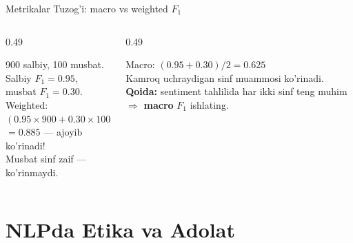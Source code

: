 \documentclass[aspectratio=169,11pt]{beamer}
\begin{document}
\begin{frame}{Metrikalar Tuzog'i: macro vs weighted $F_1$}
  \begin{columns}[T]
    \begin{column}{0.49\textwidth}
      \begin{tcolorbox}[warnbox,title=weighted $F_1$ --- aldaydi]
        \small
        900 salbiy, 100 musbat.\\
        Salbiy $F_1{=}0.95$, musbat $F_1{=}0.30$.\\[4pt]
        Weighted:\\
        $(0.95\!\times\!900+0.30\!\times\!100)/1000$\\
        $=0.885$ --- ajoyib ko'rinadi!\\[2pt]
        \alert{Musbat sinf zaif --- ko'rinmaydi.}
      \end{tcolorbox}
    \end{column}
    \begin{column}{0.49\textwidth}
      \begin{tcolorbox}[okbox,title=macro $F_1$ --- to'g'riroq]
        \small
        Macro: $(0.95+0.30)/2=0.625$\\[4pt]
        Kamroq uchraydigan sinf
        muammosi ko'rinadi.\\[4pt]
        \textbf{Qoida:} sentiment tahlilida
        har ikki sinf teng muhim
        $\Rightarrow$ \textbf{macro} $F_1$ ishlating.
      \end{tcolorbox}
    \end{column}
  \end{columns}
\end{frame}

\section[Etika]{NLPda Etika va Adolat}
\end{document}
